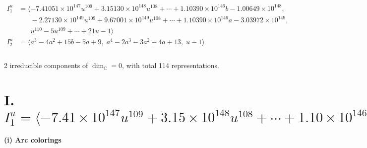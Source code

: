 \documentclass[1p]{elsarticle_modified}
\theoremstyle{definition}
\begin{document}
\begin{align*}
I^u_{1}&=\langle 
-7.41051\times10^{147} u^{109}+3.15130\times10^{148} u^{108}+\cdots+1.10390\times10^{146} b-1.00649\times10^{148},\\
\phantom{I^u_{1}}&\phantom{= \langle  }-2.27130\times10^{149} u^{109}+9.67001\times10^{149} u^{108}+\cdots+1.10390\times10^{146} a-3.03972\times10^{149},\\
\phantom{I^u_{1}}&\phantom{= \langle  }u^{110}-5 u^{109}+\cdots+21 u-1\rangle \\
I^u_{2}&=\langle 
a^3-4 a^2+15 b-5 a+9,\;a^4-2 a^3-3 a^2+4 a+13,\;u-1\rangle \\
\\
\end{align*}
\raggedright * 2 irreducible components of $\dim_{\mathbb{C}}=0$, with total 114 representations.\\
\newpage
\renewcommand{\arraystretch}{1}
\centering \section*{I. $I^u_{1}= \langle -7.41\times10^{147} u^{109}+3.15\times10^{148} u^{108}+\cdots+1.10\times10^{146} b-1.01\times10^{148},\;-2.27\times10^{149} u^{109}+9.67\times10^{149} u^{108}+\cdots+1.10\times10^{146} a-3.04\times10^{149},\;u^{110}-5 u^{109}+\cdots+21 u-1 \rangle$}
\flushleft \textbf{(i) Arc colorings}\\
\end{document}
